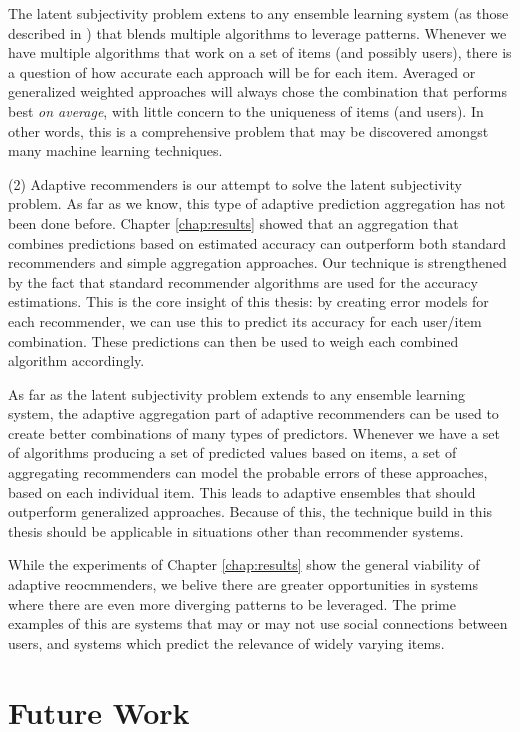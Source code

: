 The latent subjectivity problem extens to any ensemble learning system
(as those described in \cite{Polikar2006}) that blends multiple 
algorithms to leverage patterns.
Whenever we have multiple algorithms that work on a set of items
(and possibly users), there is a question of how accurate each
approach will be for each item.
Averaged or generalized weighted approaches will always
chose the combination that performs best \emph{on average},
with little concern to the uniqueness of items (and users).
In other words, this is a comprehensive problem
that may be discovered amongst many machine learning techniques.

(2) Adaptive recommenders is our attempt to solve the latent subjectivity problem.
As far as we know, this type of adaptive prediction aggregation has not been done before.
Chapter \ref{chap:results} showed that an aggregation that combines predictions based
on estimated accuracy can outperform both standard recommenders and simple aggregation approaches.
Our technique is strengthened by the fact that standard recommender algorithms
are used for the accuracy estimations.
This is the core insight of this thesis: 
by creating error models for each recommender, we can use this to predict
its accuracy for each user/item combination.
These predictions can then be used to weigh each combined algorithm accordingly.

As far as the latent subjectivity problem extends to any ensemble learning system,
the adaptive aggregation part of adaptive recommenders can be used to 
create better combinations of many types of predictors.
Whenever we have a set of algorithms producing a set of predicted values
based on items, a set of aggregating recommenders can model the probable
errors of these approaches, based on each individual item.
This leads to adaptive ensembles that should outperform generalized approaches.
Because of this, the technique build in this thesis should be 
applicable in situations other than recommender systems.

While the experiments of Chapter \ref{chap:results} show the general viability of adaptive reocmmenders,
we belive there are greater opportunities in systems where there  are even more diverging
patterns to be leveraged. The prime examples of this are systems that may or may 
not use social connections between users, and systems which predict the 
relevance of widely varying items.


\section{Future Work}      

